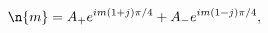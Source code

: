 \begin{equation} \label{notation-definition}
\n{m} = A_+ e^{i m (1+j)\pi/4} + A_- e^{i m (1-j)\pi/4},
\end{equation}

